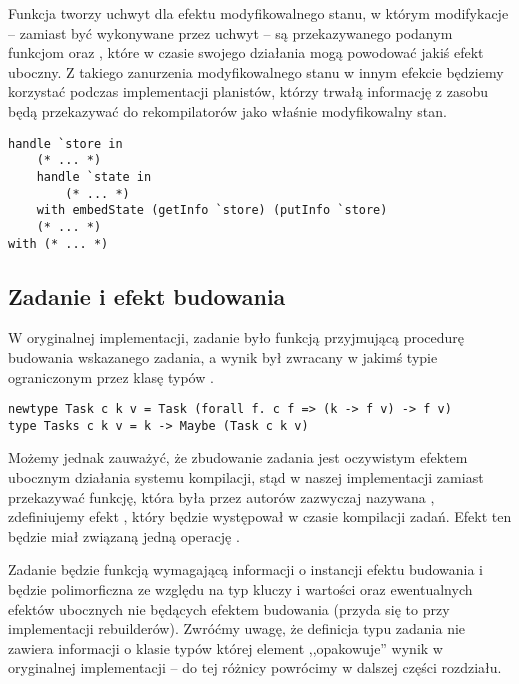 

Funkcja  tworzy uchwyt dla efektu modyfikowalnego stanu, w którym modifykacje -- zamiast być wykonywane przez uchwyt -- są przekazywanego podanym funkcjom  oraz , które w czasie swojego działania mogą powodować jakiś efekt uboczny. Z takiego zanurzenia modyfikowalnego stanu w innym efekcie będziemy korzystać podczas implementacji planistów, którzy trwałą informację z zasobu będą przekazywać do rekompilatorów jako właśnie modyfikowalny stan.

\begin{lstlisting}[language=Haleff, float=h, caption={Wykorzystanie \helinl{embedState}}]
handle `store in
    (* ... *)
    handle `state in
        (* ... *)
    with embedState (getInfo `store) (putInfo `store)
    (* ... *)
with (* ... *)
\end{lstlisting}

\subsection{Zadanie i efekt budowania}

W oryginalnej implementacji, zadanie było funkcją przyjmującą procedurę budowania wskazanego zadania, a wynik był zwracany w jakimś typie  ograniczonym przez klasę typów .

\begin{lstlisting}[style=haskell-style]
newtype Task c k v = Task (forall f. c f => (k -> f v) -> f v)
type Tasks c k v = k -> Maybe (Task c k v)
\end{lstlisting}

Możemy jednak zauważyć, że zbudowanie zadania jest oczywistym efektem ubocznym działania systemu kompilacji, stąd w naszej implementacji zamiast przekazywać funkcję, która była przez autorów zazwyczaj nazywana , zdefiniujemy efekt , który będzie występował w czasie kompilacji zadań. Efekt ten będzie miał związaną jedną operację .



Zadanie będzie funkcją wymagającą informacji o instancji efektu budowania i będzie polimorficzna ze względu na typ kluczy i wartości oraz ewentualnych efektów ubocznych nie będących efektem budowania (przyda się to przy implementacji rebuilderów). Zwróćmy uwagę, że definicja typu zadania nie zawiera informacji o klasie typów  której element  ,,opakowuje'' wynik w oryginalnej implementacji -- do tej różnicy powrócimy w dalszej części rozdziału.

